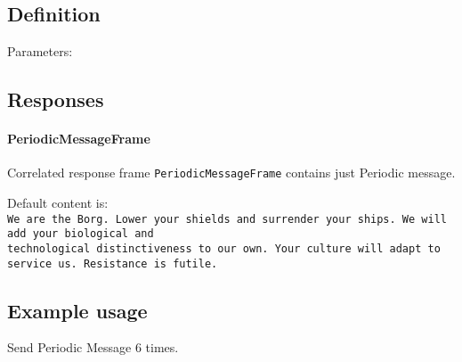 \subsection{Definition}

Parameters: 

\begin{tcarglist}
\end{tcarglist}

\subsection{Responses}

\paragraph{PeriodicMessageFrame}
Correlated response frame \texttt{PeriodicMessageFrame} contains just Periodic message.

Default content is: \\
\texttt{We are the Borg. Lower your shields and surrender your ships. We will add your biological and \\
technological distinctiveness to our own. Your culture will adapt to service us. Resistance is futile.}

\subsection{Example usage}
Send Periodic Message 6 times.
